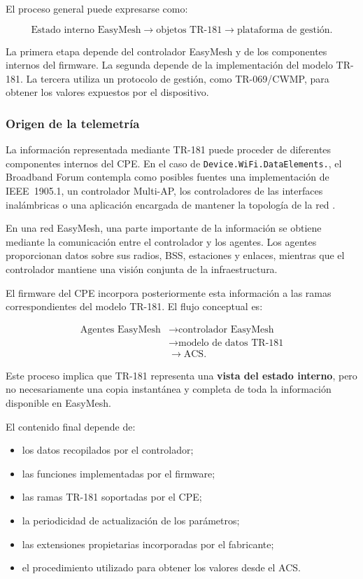 El proceso general puede expresarse como:

\[
    \text{Estado interno EasyMesh}
    \longrightarrow
    \text{objetos TR-181}
    \longrightarrow
    \text{plataforma de gestión}.
\]

La primera etapa depende del controlador EasyMesh y de los componentes
internos del firmware. La segunda depende de la implementación del modelo
TR-181. La tercera utiliza un protocolo de gestión, como
TR-069/CWMP, para obtener los valores expuestos por el dispositivo.


\subsubsection*{Origen de la telemetría}

La información representada mediante TR-181 puede proceder de diferentes
componentes internos del CPE. En el caso de
\texttt{Device.WiFi.DataElements.}, el Broadband Forum contempla como
posibles fuentes una implementación de IEEE~1905.1, un controlador
Multi-AP, los controladores de las interfaces inalámbricas o una
aplicación encargada de mantener la topología de la red
\cite{bbf_tr181}.

En una red EasyMesh, una parte importante de la información se obtiene
mediante la comunicación entre el controlador y los agentes. Los agentes
proporcionan datos sobre sus radios, BSS, estaciones y enlaces, mientras
que el controlador mantiene una visión conjunta de la infraestructura.

El firmware del CPE incorpora posteriormente esta información a las
ramas correspondientes del modelo TR-181. El flujo conceptual es:

\[
\begin{aligned}
    \text{Agentes EasyMesh}
    &\longrightarrow
    \text{controlador EasyMesh}\\
    &\longrightarrow
    \text{modelo de datos TR-181}\\
    &\longrightarrow
    \text{ACS}.
\end{aligned}
\]

Este proceso implica que TR-181 representa una
\textbf{vista del estado interno}, pero no necesariamente una copia
instantánea y completa de toda la información disponible en EasyMesh.

El contenido final depende de:

\begin{itemize}
    \item los datos recopilados por el controlador;
    \item las funciones implementadas por el firmware;
    \item las ramas TR-181 soportadas por el CPE;
    \item la periodicidad de actualización de los parámetros;
    \item las extensiones propietarias incorporadas por el fabricante;
    \item el procedimiento utilizado para obtener los valores desde el
    ACS.
\end{itemize}


